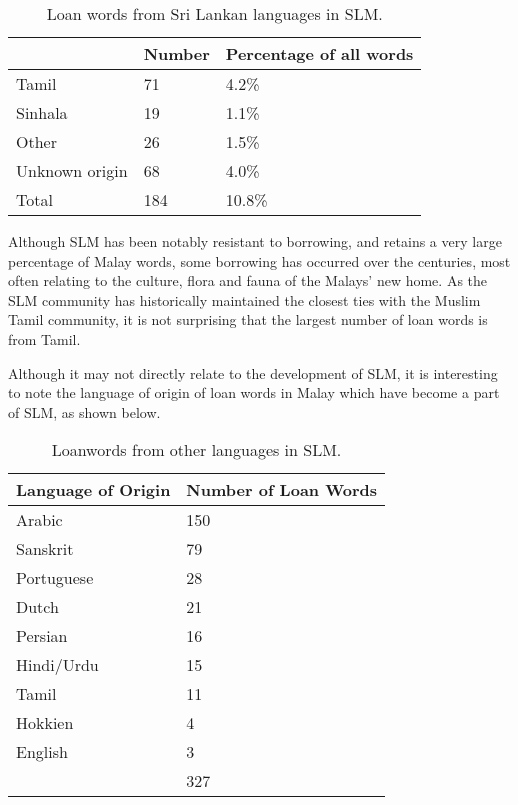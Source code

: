 \begin{table}
\centering
\begin{tabular}{lll}
 &
\textbf{Number} &
\textbf{Percentage of all words}\\\hline
Tamil &
71 &
 4.2\%\\
Sinhala &
19 &
 1.1\%\\
Other\footnotemark{} &
26 &
 1.5\%\\
Unknown origin\footnotemark{} &
68 &
 4.0\%\\\hline
Total &
184 &
10.8\%\\
\end{tabular}
\caption{Loan words from Sri Lankan languages in SLM.}
\label{paauw:tab:slloanwords}
\end{table}
\addtocounter{footnote}{-2}
Although SLM has been notably resistant to borrowing, and retains a very large percentage of Malay words, some borrowing has occurred over the centuries, most often relating to the culture, flora and fauna of the Malays' new home. As the SLM community has historically maintained the closest ties with the Muslim Tamil community, it is not surprising that the largest number of loan words is from Tamil.

Although it may not directly relate to the development of SLM, it is interesting to note the language of origin of loan words in Malay which have become a part of SLM, as shown below.

\begin{table}
\centering
\begin{tabular}{ll}
\textbf{Language of Origin} &
\textbf{Number of Loan Words}\\\hline
Arabic &
150\\
Sanskrit &
 79\\
Portuguese &
 28\\
Dutch &
 21\\
Persian &
 16\\
Hindi/Urdu &
 15\\
Tamil &
 11\\
Hokkien &
 4\\
English &
 3\\\hline
 &
327\\
\end{tabular}
\caption{Loanwords from other languages in SLM.}
\label{paauw:tab:otherloanwords}
\end{table}

